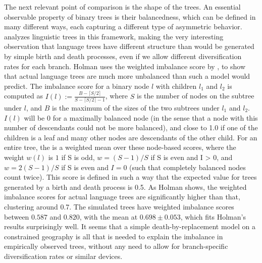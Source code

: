 The next relevant point of comparison is the shape of the trees. An essential observable property of binary trees is their balancedness, which can be defined in many different ways, each capturing a different type of asymmetric behavior. \cite{holman2005} analyzes linguistic trees in this framework, making the very interesting observation that language trees have different structure than would be generated by simple birth and death processes, even if we allow different diversification rates for each branch. Holman uses the weighted imbalance score by \cite{purvis_ea_2002}, to show that actual language trees are much more unbalanced than such a model would predict. The imbalance score for a binary node $l$ with children $l_1$ and $l_2$ is computed as $I(l) := \frac{B - \lceil S/2 \rceil}{S - \lceil S/2 \rceil - 1}$, where $S$ is the number of nodes on the subtree under $l$, and $B$ is the maximum of the sizes of the two subtrees under $l_1$ and $l_2$. $I(l)$ will be 0 for a maximally balanced node (in the 
sense that a node with this number of descendants could not be more balanced), and close to 1.0 if one of the children is a leaf and many other nodes are descendants of the other child. For an entire tree, the  is a weighted mean over these node-based scores, where the weight $w(l)$ is $1$ if S is odd, $w = (S-1)/S$ if S is even and I > 0, and $w = 2(S-1)/S$ if S is even and $I = 0$ (such that completely balanced nodes count twice). This score is defined in such a way that the expected value for trees generated by a birth and death process is 0.5. As Holman shows, the weighted imbalance scores for actual language trees are significantly higher than that, clustering around 0.7. The simulated trees have weighted imbalance scores between $0.587$ and $0.820$, with the mean at $0.698 \pm 0.053$, which fits Holman's results surprisingly well. It seems that a simple death-by-replacement model on a constrained geography is all that is needed to explain the imbalance in empirically 
observed trees, without any need to allow for branch-specific diversification rates or similar devices.

